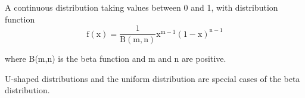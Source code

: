 A continuous distribution taking values between 0 and 1, with distribution function
\[ \mathrm{f(x)} = \frac{1}{\mathrm{B(m,n)}} \mathrm{x} ^{\mathrm{m}-1} 
( 1- \mathrm{x} ) ^ {\mathrm{n}-1} \]
\par
where B(m,n) is the beta function and m and n are positive.
\par
U-shaped distributions and the uniform distribution are special cases of the
beta distribution.